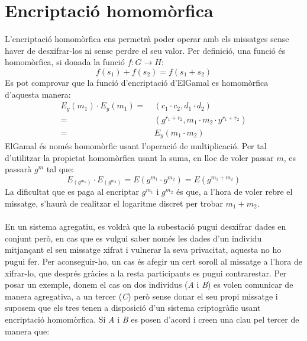 \documentclass{article}
\begin{document}
\section{Encriptació homomòrfica}\label{subsec:homomorfism}
L'encriptació homomòrfica ens permetrà poder operar amb els missatges sense haver de desxifrar-los ni sense perdre el seu valor.
Per definició, una funció és homomòrfica, si donada la funció $f: G \rightarrow H$:
\[f(s_1) + f(s_2) = f(s_1+s_2)\]
Es pot comprovar que la funció d'encriptació d'ElGamal es homomòrfica d'aquesta manera:
\begin{equation*}
\begin{aligned}
	E_y(m_1) \cdot E_y(m_1) =& \ (c_1 \cdot c_2, d_1 \cdot d_2)\\
	=& \ (g^{r_1 + r_2}, m_1 \cdot m_2 \cdot y^{r_1 + r_2} ) \\
	=& \ E_y(m_1 \cdot m_2)
\end{aligned}
\end{equation*}
ElGamal és només homomòrfic usant l'operació de multiplicació. Per tal d'utilitzar la propietat homomòrfica usant la suma, en lloc de voler passar $m$, es passarà $g^m$ tal que:
\[E_(g^{m_1})  \cdot E_(g^{m_2}) = E(g^{m_1} \cdot g^{m_2}) = E(g^{m_1 + m_2})\] 
La dificultat que es paga al encriptar $g^{m_1}$ i $g^{m_2}$ és que, a l'hora de voler rebre el missatge, s'haurà de realitzar el logaritme discret per trobar $m_1 + m _2$.
\\
\\
En un sistema agregatiu, es voldrà que la subestació pugui desxifrar dades en conjunt però, en cas que es vulgui saber només les dades d'un individu mitjançant el seu missatge xifrat i vulnerar la seva privacitat, aquesta no ho pugui fer. Per aconseguir-ho, un cas és afegir un cert soroll al missatge a l'hora de xifrar-lo, que després gràcies a la resta participants es pugui contrarestar. Per posar un exemple, donem el cas on dos individus (\textit{A} i \textit{B}) es volen comunicar de manera agregativa, a un tercer (\textit{C}) però sense donar el seu propi missatge i suposem que els tres tenen a disposició d'un sistema criptogràfic usant encriptació homomòrfica. Si \textit{A} i \textit{B} es posen d'acord i creen una clau pel tercer de manera que:
\end{document}
